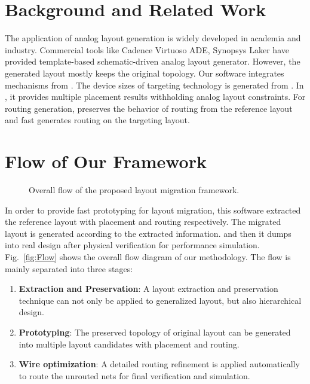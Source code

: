 
\section{Background and Related Work}

  The application of analog layout generation is widely developed in academia and industry. Commercial tools like Cadence Virtuoso ADE, Synopsys Laker have provided template-based schematic-driven analog layout generator. However, the generated layout mostly keeps the original topology. Our software integrates mechanisms from \cite{ALP_YPWeng_iccad2011,Chin_DMR_ICCAD2013,PAGE_DATE2013}. The device sizes of targeting technology is generated from \cite{PAGE_DATE2013}. In \cite{ALP_YPWeng_iccad2011}, it provides multiple placement results withholding analog layout constraints. For routing generation, \cite{Chin_DMR_ICCAD2013} preserves the behavior of routing from the reference layout and fast generates routing on the targeting layout.

   

\section{Flow of Our Framework}
  \begin{figure}[ht]
    \centering
    \centerline{}
    \caption{Overall flow of the proposed layout migration framework.} 
    \centering{\label{fig:Flow}}
  \end{figure}


  In order to provide fast prototyping for layout migration, this software extracted the reference layout with placement and routing respectively. The migrated layout is generated according to the extracted information. and then it dumps into real design after physical verification for performance simulation. Fig.~\ref{fig:Flow} shows the overall flow diagram of our methodology.
  The flow is mainly separated into three stages: 
  \begin{enumerate}
    \item {\bf Extraction and Preservation}: A layout extraction and preservation technique \cite{Chin_DMR_ICCAD2013} can not only be applied to generalized layout, but also hierarchical design.
    \item {\bf Prototyping}: The preserved topology of original layout can be generated into multiple layout candidates with placement and routing. 
    \item {\bf Wire optimization}: A detailed routing refinement is applied automatically to route the unrouted nets for final verification and simulation.
  \end{enumerate}

